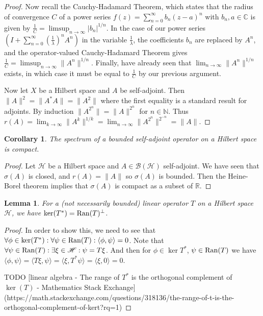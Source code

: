\documentclass[12pt,oneside]{report}
\newtheorem{cor}[thm]{Corollary}
\newtheorem{lem}[thm]{Lemma}
\begin{document}
\begin{proof}
    Now recall the Cauchy-Hadamard Theorem, which states that the radius of convergence $C$ of a power series $f(z)= \sum_{n=0}^{\infty} b_{n}(z-a)^{n}$ with $b_{n}, a \in \mathbb{C}$ is given by $\frac{1}{C} = \limsup_{n \to \infty} |b_{n}|^{1/n}$. In the case of our power series $\left( I + \sum_{n=0}^{\infty} \left( \frac{1}{\lambda} \right)^{n}A^{n} \right)$ in the variable $\frac{1}{\lambda}$, the coefficients $b_{n}$ are replaced by $A^{n}$, and the operator-valued Cauchy-Hadamard Theorem gives $\frac{1}{C} = \limsup_{n \to \infty} \|A^{n}\|^{1/n}$. Finally, have already seen that $\lim_{ n \to \infty }\|A^{n}\|^{1/n}$ exists, in which case it must be equal to $\frac{1}{C}$ by our previous argument.

    Now let $X$ be a Hilbert space and $A$ be self-adjoint. Then $\|A\|^{2} = \|A^{*}A\| = \|A^{2}\|$ where the first equality is a standard result for adjoints. By induction $\|A^{2^{n}}\| = \|A\|^{2^{n}}$ for $n \in \mathbb{N}$. Thus $r(A) = \lim_{ k \to \infty } \|A^{k}\|^{1/k} = \lim_{ n \to \infty } \|A^{2^{n}}\|^{2^{-n}} = \|A\|$.
\end{proof}

\begin{cor}
    The spectrum of a bounded self-adjoint operator on a Hilbert space is compact.
\end{cor}
\begin{proof}
    Let $\mathscr{H}$ be a Hilbert space and $A \in \mathscr{B}(\mathscr{H})$ self-adjoint. We have seen that $\sigma(A)$ is closed, and $r(A) = \|A\|$ so $\sigma(A)$ is bounded. Then the Heine-Borel theorem implies that $\sigma(A)$ is compact as a subset of $\mathbb{R}$.
\end{proof}

\begin{lem}\label{adjoint-ker-orth-to-operator-range}
    For a (not necessarily bounded) linear operator $T$ on a Hilbert space $\mathscr{H}$, we have $\ker(T^{*}) = \mathrm{Ran}(T)^{\perp}$.
\end{lem}
\begin{proof}
    In order to show this, we need to see that $\forall \phi \in \ker(T^{*}): \forall \psi \in \mathrm{Ran}(T): \langle \phi, \psi \rangle = 0$. Note that $\forall \psi \in \mathrm{Ran}(T): \exists \xi \in \mathscr{H}: \psi = T\xi$. And then for $\phi \in \ker{T^*}$, $\psi \in \mathrm{Ran}(T)$ we have $\langle \phi, \psi \rangle = \langle T\xi,\psi \rangle = \langle \xi,T^{*}\psi \rangle = \langle \xi, 0 \rangle = 0$.
    
    TODO [linear algebra - The range of $T^*$ is the orthogonal complement of $\ker(T)$ - Mathematics Stack Exchange](https://math.stackexchange.com/questions/318136/the-range-of-t-is-the-orthogonal-complement-of-kert?rq=1)
\end{proof}
\end{document}
